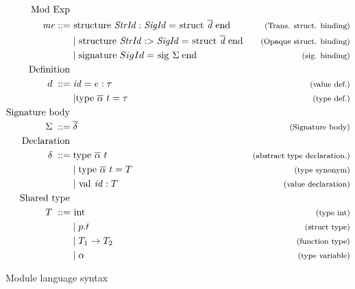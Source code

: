 \begin{figure}[!htb]
\newcommand{\ova}{\overline{\alpha}}
\begin{align*}
\begin{aligned}
%
\text{Mod Exp }\\
\mathit{me} ::= \; & \text{\lsttext{structure}} \;  \mathit{StrId : SigId} = \text{\lsttext{struct}}\; \overline{\mathit{d}}\; \text{\lsttext{end}}
                                             & \expl{(Trans. struct. binding)}\\
&|\; \text{\lsttext{structure}} \;  \mathit{StrId :> SigId} = 
\text{\lsttext{struct}}\; \overline{\mathit{d}}\; \text{\lsttext{end}}
                                             & \expl{(Opaque struct. binding)}\\
&|\; \text{\lsttext{signature}} \; SigId = 
\text{\lsttext{sig}}\; \Sigma \; \text{\lsttext{end}} 
                                             & \expl{(sig. binding)}\\
%
\text{Definition }\\
d \; ::= \; &\mathit{id}=e:\tau                    & \expl{(value def.)} \\
& | \text{\lsttext{type}}\ \ova\ t= \tau           & \expl{(type def.)} \\
%
\text{Signature body } \\
\Sigma \; ::= \; &\overline{\delta}                    & \expl{(Signature body)}\\
%
\text{Declaration }\\
\delta \; ::= \; & \text{\lsttext{type}}\ \ova\ t  & \expl{(abstract type declaration.)} \\
& | \; \text{\lsttext{type}}\ \ova\ t = T          & \expl{(type synonym)} \\
& | \; \text{\lsttext{val}}\ \mathit{id}:T         & \expl{(value declaration)} \\
%
\text{Shared type } \\
T \; ::= \; &\text{\lsttext{int}}                  & \expl{(type int)} \\
&| \; p.t                                          & \expl{(struct type)}\\
&| \; T_{1} \rightarrow T_{2}                      & \expl{(function type)}\\
&| \; \alpha                                       & \expl{(type variable)}
\end{aligned}
\end{align*}
\caption{Module language syntax \label{fig:ModuleSyntax}}
\label{fig:Syntax}
\end{figure}
